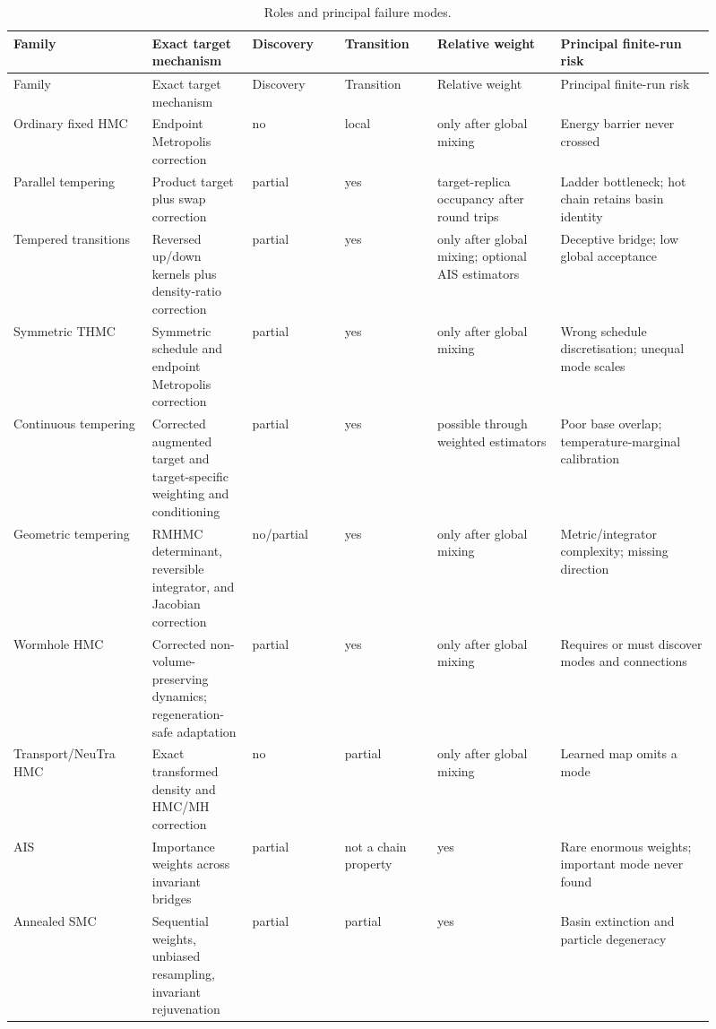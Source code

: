 \documentclass[11pt]{article}
\newcommand{\cmark}{\textsf{yes}}
\newcommand{\pmark}{\textsf{partial}}
\newcommand{\xmark}{\textsf{no}}
\begin{document}
\small
\begingroup
\setlength{\tabcolsep}{3pt}
\begin{longtable}{p{0.18\linewidth}p{0.13\linewidth}p{0.12\linewidth}p{0.12\linewidth}p{0.16\linewidth}p{0.20\linewidth}}
\caption{Roles and principal failure modes.}\label{tab:comparison}\\
\toprule
Family & Exact target mechanism & Discovery & Transition & Relative weight & Principal finite-run risk \\
\midrule
\endfirsthead
\toprule
Family & Exact target mechanism & Discovery & Transition & Relative weight & Principal finite-run risk \\
\midrule
\endhead
Ordinary fixed HMC & Endpoint Metropolis correction & \xmark & local & only after global mixing & Energy barrier never crossed \\
Parallel tempering & Product target plus swap correction & \pmark & \cmark & target-replica occupancy after round trips & Ladder bottleneck; hot chain retains basin identity \\
Tempered transitions & Reversed up/down kernels plus density-ratio correction & \pmark & \cmark & only after global mixing; optional AIS estimators & Deceptive bridge; low global acceptance \\
Symmetric THMC & Symmetric schedule and endpoint Metropolis correction & \pmark & \cmark & only after global mixing & Wrong schedule discretisation; unequal mode scales \\
Continuous tempering & Corrected augmented target and target-specific weighting and conditioning & \pmark & \cmark & possible through weighted estimators & Poor base overlap; temperature-marginal calibration \\
Geometric tempering & RMHMC determinant, reversible integrator, and Jacobian correction & \xmark/\pmark & \cmark & only after global mixing & Metric/integrator complexity; missing direction \\
Wormhole HMC & Corrected non-volume-preserving dynamics; regeneration-safe adaptation & \pmark & \cmark & only after global mixing & Requires or must discover modes and connections \\
Transport/NeuTra HMC & Exact transformed density and HMC/MH correction & \xmark & \pmark & only after global mixing & Learned map omits a mode \\
AIS & Importance weights across invariant bridges & \pmark & not a chain property & \cmark & Rare enormous weights; important mode never found \\
Annealed SMC & Sequential weights, unbiased resampling, invariant rejuvenation & \pmark & \pmark & \cmark & Basin extinction and particle degeneracy \\
\bottomrule
\end{longtable}
\endgroup
\normalsize
\end{document}
